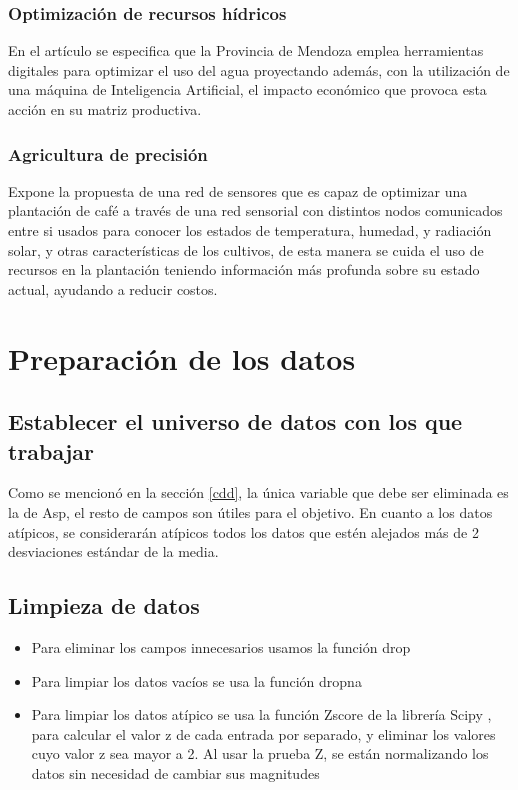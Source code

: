 \documentclass{article}
\begin{document}
\subsubsection{Optimización de recursos hídricos}

En el artículo se especifica que la Provincia de Mendoza emplea herramientas digitales para optimizar el uso del agua proyectando además, con la utilización de una máquina de Inteligencia Artificial, el impacto económico que provoca esta acción en su matriz productiva. \cite{inproceedings}

\subsubsection{Agricultura de precisión}

Expone la propuesta de una red de sensores que es capaz de optimizar una plantación de café a través de una red sensorial con distintos nodos comunicados entre si usados para conocer los estados de temperatura, humedad, y radiación solar, y otras características de los cultivos, de esta manera se cuida el uso de recursos en la plantación teniendo información más profunda sobre su estado actual, ayudando a reducir costos. \cite{urbano2013redes}

\section{Preparación de los datos}
\subsection{Establecer el universo de datos con los que trabajar}

Como se mencionó en la sección \ref{cdd}, la única variable que debe ser eliminada es la de Asp, el resto de campos son útiles para el objetivo. En cuanto a los datos atípicos, se considerarán atípicos todos los datos que estén alejados más de 2 desviaciones estándar de la media. 

\subsection{Limpieza de datos}\label{ldd}
\begin{itemize}
    \item Para eliminar los campos innecesarios usamos la función drop
    \item Para limpiar los datos vacíos se usa la función dropna 
    \item Para limpiar los datos atípico se usa la función Zscore de la librería Scipy \cite{2020SciPy-NMeth}, para calcular el valor z de cada entrada por separado, y eliminar los valores cuyo valor z sea mayor a 2. Al usar la prueba Z, se están normalizando los datos sin necesidad de cambiar sus magnitudes
\end{itemize}
\end{document}
